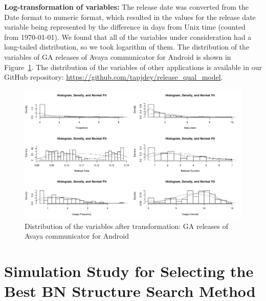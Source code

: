\documentclass[smallextended]{svjour3}       %
\begin{document}
\noindent
\textbf{Log-transformation of variables:}
The release date was converted from the Date format to numeric format, which 
resulted in the values for the release date variable being represented by the 
difference in days from Unix time (counted from 1970-01-01).
We found that all of the variables under consideration
had a long-tailed distribution, so we took logarithm of them. 
The distribution of the variables of GA releases of Avaya communicator 
for Android is shown in Figure~\ref{fig:distr}.
The distribution of the variables of other applications  is available in our GitHub repository: \url{https://github.com/tapjdey/release\_qual\_model}.

\begin{figure}[!t]
\centering
\includegraphics[width=0.9\linewidth]{distr}%
\caption{Distribution of the variables after transformation: GA releases of Avaya communicator for Android}
\label{fig:distr}
\vspace{-20pt}
\end{figure}


\section{Simulation Study for Selecting the Best BN Structure Search Method}\label{s:sim}
\end{document}
